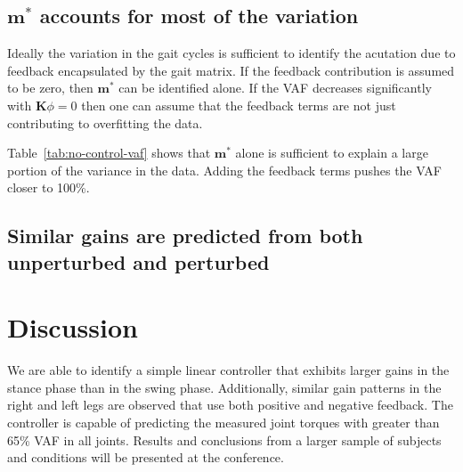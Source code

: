 \documentclass{article}
\begin{document}
\subsection*{$\mathbf{m}^*$ accounts for most of the variation}
%
Ideally the variation in the gait cycles is sufficient to identify the
acutation due to feedback encapsulated by the gait matrix. If the feedback
contribution is assumed to be zero, then $\mathbf{m}^*$ can be identified
alone. If the VAF decreases significantly with $\mathbf{K}{\phi}=0$ then one
can assume that the feedback terms are not just contributing to overfitting the
data.
%
\begin{table}
  \cprotect\caption{Generated by \verb|src/table_no_control_vaf_comparison.py|.}
  \centering
  
  \label{tab:no-control-vaf}
\end{table}

Table~\ref{tab:no-control-vaf} shows that $\mathbf{m}^*$ alone is sufficient to
explain a large portion of the variance in the data. Adding the feedback terms
pushes the VAF closer to 100\%.

\subsection*{Similar gains are predicted from both unperturbed and perturbed}
%

\section*{Discussion}
%
We are able to identify a simple linear controller that exhibits larger gains
in the stance phase than in the swing phase. Additionally, similar gain
patterns in the right and left legs are observed that use both positive and
negative feedback. The controller is capable of predicting the measured joint
torques with greater than 65\% VAF in all joints. Results and conclusions from
a larger sample of subjects and conditions will be presented at the conference.

%
\end{document}
